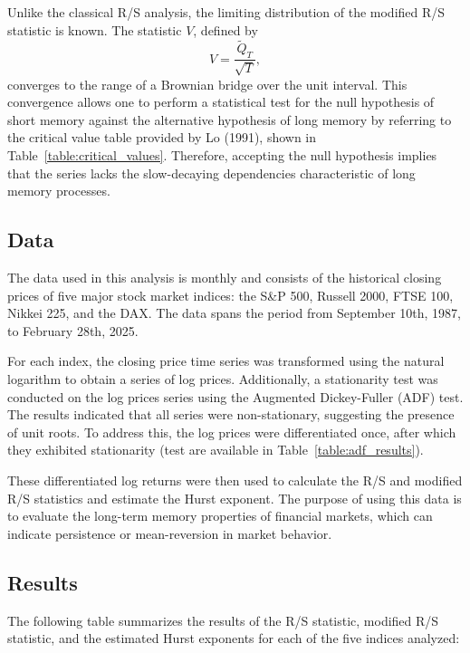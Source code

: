 \documentclass[11pt]{extarticle}
\begin{document}
Unlike the classical R/S analysis, the limiting distribution of the modified R/S statistic is known. The statistic \(V\), defined by
\begin{equation}
    V = \frac{\tilde{Q}_T}{\sqrt{T}},
\end{equation}
converges to the range of a Brownian bridge over the unit interval.
This convergence allows one to perform a statistical test for the null hypothesis of short memory against the
alternative hypothesis of long memory by referring to the critical value table provided by Lo (1991), shown in Table~\ref{table:critical_values}.
Therefore, accepting the null hypothesis implies that the series lacks the slow-decaying dependencies characteristic of long memory processes.

\subsection{Data}
\label{sec:data}

The data used in this analysis is monthly and consists of the historical closing prices of five major stock market indices: the S\&P 500,
Russell 2000, FTSE 100, Nikkei 225, and the DAX.
The data spans the period from September 10th, 1987, to February 28th, 2025.

For each index, the closing price time series was transformed using the natural logarithm to obtain a series of log prices.
Additionally, a stationarity test was conducted on the log prices series using the Augmented Dickey-Fuller (ADF) test.
The results indicated that all series were non-stationary, suggesting the presence of unit roots.
To address this, the log prices were differentiated once, after which they exhibited stationarity (test are available
in Table~\ref{table:adf_results}).

These differentiated log returns were then used to calculate the R/S and modified R/S statistics and estimate the Hurst exponent.
The purpose of using this data is to evaluate the long-term memory properties of financial markets, which can indicate persistence or mean-reversion in market behavior.



\subsection{Results}
\label{sec:results}

The following table summarizes the results of the R/S statistic, modified R/S statistic, and the estimated Hurst exponents for each of the five indices analyzed: \\
\end{document}
